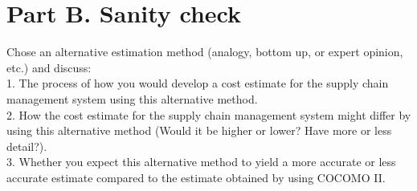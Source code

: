 \documentclass[12pt,letterpaper]{article}
\begin{document}
\section*{Part B. Sanity check}
Chose an alternative estimation method (analogy, bottom up, or expert opinion, etc.) and discuss:\\
1.	The process of how you would develop a cost estimate for the supply chain management system using this alternative method.\\
2.	How the cost estimate for the supply chain management system might differ by using this alternative method (Would it be higher or lower?  Have more or less detail?).\\
3.	Whether you expect this alternative method to yield a more accurate or less accurate estimate compared to the estimate obtained by using COCOMO II. \\
\end{document}
